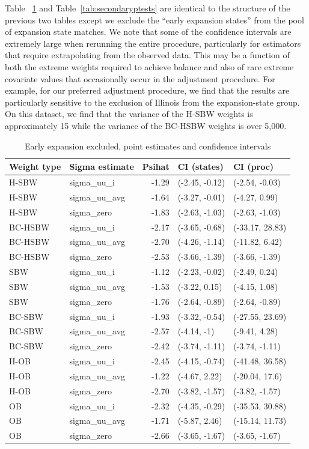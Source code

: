 \documentclass[12pt]{article}
\begin{document}
Table ~\ref{tab:confintmainc2} and Table~\ref{tab:secondaryptests} are identical to the structure of the previous two tables except we exclude the ``early expansion states'' from the pool of expansion state matches. We note that some of the confidence intervals are extremely large when rerunning the entire procedure, particularly for estimators that require extrapolating from the observed data. This may be a function of both the extreme weights required to achieve balance and also of rare extreme covariate values that occasionally occur in the adjustment procedure. For example, for our preferred adjustment procedure, we find that the results are particularly sensitive to the exclusion of Illinois from the expansion-state group. On this dataset, we find that the variance of the H-SBW weights is approximately 15 while the variance of the BC-HSBW weights is over 5,000.

\begin{table}[ht]
\centering
\begin{tabular}{llrll}
  \toprule
Weight type & Sigma estimate & Psihat & CI (states) & CI (proc) \\ 
  \midrule
H-SBW & sigma\_uu\_i & -1.29 & (-2.45, -0.12) & (-2.54, -0.03) \\ 
  H-SBW & sigma\_uu\_avg & -1.64 & (-3.27, -0.01) & (-4.27, 0.99) \\ 
  H-SBW & sigma\_zero & -1.83 & (-2.63, -1.03) & (-2.63, -1.03) \\ 
  BC-HSBW & sigma\_uu\_i & -2.17 & (-3.65, -0.68) & (-33.17, 28.83) \\ 
  BC-HSBW & sigma\_uu\_avg & -2.70 & (-4.26, -1.14) & (-11.82, 6.42) \\ 
  BC-HSBW & sigma\_zero & -2.53 & (-3.66, -1.39) & (-3.66, -1.39) \\ 
  SBW & sigma\_uu\_i & -1.12 & (-2.23, -0.02) & (-2.49, 0.24) \\ 
  SBW & sigma\_uu\_avg & -1.53 & (-3.22, 0.15) & (-4.15, 1.08) \\ 
  SBW & sigma\_zero & -1.76 & (-2.64, -0.89) & (-2.64, -0.89) \\ 
  BC-SBW & sigma\_uu\_i & -1.93 & (-3.32, -0.54) & (-27.55, 23.69) \\ 
  BC-SBW & sigma\_uu\_avg & -2.57 & (-4.14, -1) & (-9.41, 4.28) \\ 
  BC-SBW & sigma\_zero & -2.42 & (-3.74, -1.11) & (-3.74, -1.11) \\ 
  H-OB & sigma\_uu\_i & -2.45 & (-4.15, -0.74) & (-41.48, 36.58) \\ 
  H-OB & sigma\_uu\_avg & -1.22 & (-4.67, 2.22) & (-20.04, 17.6) \\ 
  H-OB & sigma\_zero & -2.70 & (-3.82, -1.57) & (-3.82, -1.57) \\ 
  OB & sigma\_uu\_i & -2.32 & (-4.35, -0.29) & (-35.53, 30.88) \\ 
  OB & sigma\_uu\_avg & -1.71 & (-5.87, 2.46) & (-15.14, 11.73) \\ 
  OB & sigma\_zero & -2.66 & (-3.65, -1.67) & (-3.65, -1.67) \\ 
   \bottomrule
\end{tabular}
\caption{Early expansion excluded, point estimates and confidence intervals}
\label{tab:confintmainc2}
\end{table}
\end{document}
